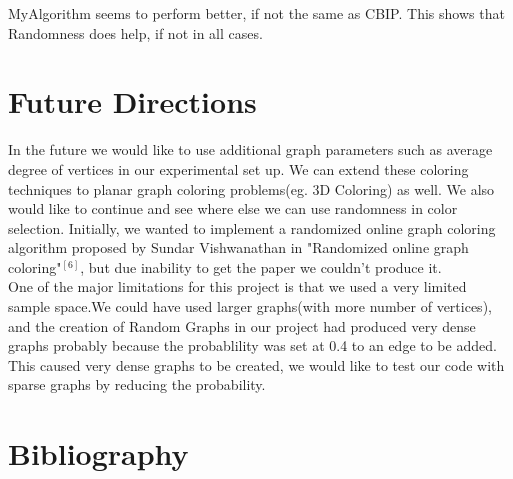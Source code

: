 \documentclass{article}
\begin{document}
MyAlgorithm seems to perform better, if not the same as CBIP. This shows that Randomness does help, if not in all cases. 



\section{Future Directions}


In the future we would like to use additional graph parameters such as average degree of vertices in our experimental set up. We can extend these coloring techniques to planar  graph coloring problems(eg. 3D Coloring) as well. We also would like to continue and see
 where else we can use randomness in color selection. Initially, we wanted to implement a randomized online graph coloring algorithm proposed 
by Sundar Vishwanathan in "Randomized online graph coloring"$^{[6]}$, but due inability to get the paper we couldn't produce it.\\

One of the major limitations for this project is that we used a very limited sample space.We could have used larger graphs(with more number of
vertices), and  the creation of Random Graphs in our project had produced very dense graphs probably because the probablility was set at 0.4 
to an edge to be added. This caused very dense graphs to be created, we would like to test our code with sparse graphs by reducing the probability. 
\newpage

\section{Bibliography}
\end{document}
